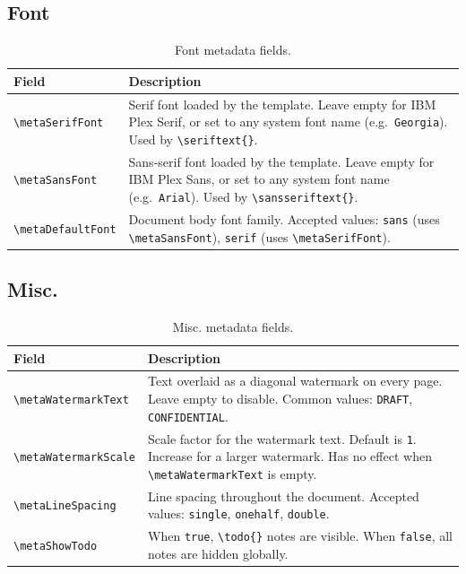 \subsection{Font}

\begin{table}[H]
	\centering
	\caption{Font metadata fields.}
	\label{tab:meta-font}
	\begin{tabularx}{\linewidth}{@{}lX@{}}
		\toprule
		Field & Description \\
		\midrule
		\texttt{\textbackslash metaSerifFont}      & Serif font loaded by the template. Leave empty for IBM Plex Serif, or set to any system font name (e.g.\ \texttt{Georgia}). Used by \texttt{\textbackslash seriftext\{\}}. \\
		\texttt{\textbackslash metaSansFont}       & Sans-serif font loaded by the template. Leave empty for IBM Plex Sans, or set to any system font name (e.g.\ \texttt{Arial}). Used by \texttt{\textbackslash sansseriftext\{\}}. \\
		\texttt{\textbackslash metaDefaultFont}    & Document body font family. Accepted values: \texttt{sans} (uses \texttt{\textbackslash metaSansFont}), \texttt{serif} (uses \texttt{\textbackslash metaSerifFont}). \\
		\bottomrule
	\end{tabularx}
\end{table}

\subsection{Misc.}

\begin{table}[H]
	\centering
	\caption{Misc. metadata fields.}
	\label{tab:meta-appearance}
	\begin{tabularx}{\linewidth}{@{}lX@{}}
		\toprule
		Field & Description \\
		\midrule
		\texttt{\textbackslash metaWatermarkText}  & Text overlaid as a diagonal watermark on every page. Leave empty to disable. Common values: \texttt{DRAFT}, \texttt{CONFIDENTIAL}. \\
		\texttt{\textbackslash metaWatermarkScale} & Scale factor for the watermark text. Default is \texttt{1}. Increase for a larger watermark. Has no effect when \texttt{\textbackslash metaWatermarkText} is empty. \\
		\texttt{\textbackslash metaLineSpacing}    & Line spacing throughout the document. Accepted values: \texttt{single}, \texttt{onehalf}, \texttt{double}. \\
		\texttt{\textbackslash metaShowTodo}       & When \texttt{true}, \texttt{\textbackslash todo\{\}} notes are visible. When \texttt{false}, all notes are hidden globally. \\
		\bottomrule
	\end{tabularx}
\end{table}

